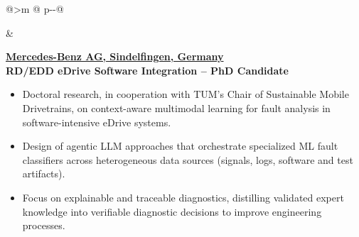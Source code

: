 \newlength{\datecol}
\setlength{\datecol}{2.7cm}   %

\newlength{\colgap}
\setlength{\colgap}{6mm}      %


\begin{tabular}{@{}>{\raggedleft\arraybackslash}m{\datecol} @{\hspace{\colgap}} p{\dimexpr\textwidth-\datecol-\colgap\relax}@{}}


 &
\begin{minipage}[t]{\linewidth}\vspace{0pt}
\begin{expblock}
  \footnotesize
  \setlength{\parindent}{0pt}\setlength{\parskip}{0pt}
  \textbf{\href{https://group.mercedes-benz.com}{Mercedes-Benz AG, Sindelfingen, Germany}}\\[-0.1em]
  \textbf{RD/EDD eDrive Software Integration – PhD Candidate}\\[-1em]
  \begin{itemize}[nosep,leftmargin=1em]
    \item Doctoral research, in cooperation with TUM's Chair of Sustainable Mobile Drivetrains, on context-aware multimodal learning for fault analysis in software-intensive eDrive systems.
    \item Design of agentic LLM approaches that orchestrate specialized ML fault classifiers across heterogeneous data sources (signals, logs, software and test artifacts).
    \item Focus on explainable and traceable diagnostics, distilling validated expert knowledge into verifiable diagnostic decisions to improve engineering processes.
  \end{itemize}
\end{expblock}
\end{minipage}
\\[-0.2em]


\end{tabular}
